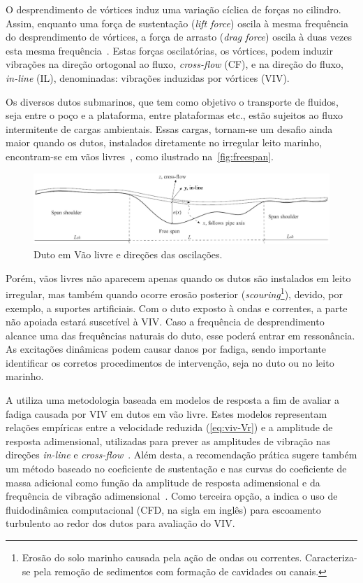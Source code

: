 O desprendimento de vórtices induz uma variação cíclica de forças no cilindro.
Assim, enquanto uma força de sustentação (\textit{lift force}) oscila à mesma frequência do desprendimento de vórtices, a força de arrasto (\textit{drag force}) oscila à duas vezes esta mesma frequência~\cite{Sumer1995}.
Estas forças oscilatórias, os vórtices, podem induzir vibrações na direção ortogonal ao fluxo, \textit{cross-flow} (CF), e na direção do fluxo, \textit{in-line} (IL), denominadas: vibrações induzidas por vórtices (VIV).

Os diversos dutos submarinos, que tem como objetivo o transporte de fluidos, seja entre o poço e a plataforma, entre plataformas etc., estão sujeitos ao fluxo intermitente de cargas ambientais.
Essas cargas, tornam-se um desafio ainda maior quando os dutos, instalados diretamente no irregular leito marinho, encontram-se em vãos livres~\cite{Fyrileiv1998}, como ilustrado na~\autoref{fig:freespan}.

\begin{figure}[!ht]
	\centering
    \caption{Duto em Vão livre e direções das oscilações.}\label{fig:freespan}
	\includegraphics[width=1\textwidth]{imagens/freespan}
\end{figure}

Porém, vãos livres não aparecem apenas quando os dutos são instalados em leito irregular, mas também quando ocorre erosão posterior (\textit{scouring}\footnote{Erosão do solo marinho causada pela ação de ondas ou correntes. Caracteriza-se pela remoção de sedimentos com formação de cavidades ou canais.}), devido, por exemplo, a suportes artificiais.
Com o duto exposto à ondas e correntes, a parte não apoiada estará suscetível à VIV.\@
Caso a frequência de desprendimento alcance uma das frequências naturais do duto, esse poderá entrar em ressonância.
As excitações dinâmicas podem causar danos por fadiga, sendo importante identificar os corretos procedimentos de intervenção, seja no duto ou no leito marinho.

A  utiliza uma metodologia baseada em modelos de resposta a fim de avaliar a fadiga causada por VIV em dutos em vão livre.
Estes modelos representam relações empíricas entre a velocidade reduzida (\autoref{eq:viv-Vr}) e a amplitude de resposta adimensional, utilizadas para prever as amplitudes de vibração nas direções \textit{in-line} e \textit{cross-flow}~\cite{Mork2003,DNV2017}.
Além desta, a recomendação prática sugere também um método baseado no coeficiente de sustentação e nas curvas do coeficiente de massa adicional como função da amplitude de resposta adimensional e da frequência de vibração adimensional~\cite{DNV2017}.
Como terceira opção, a  indica o uso de fluidodinâmica computacional (CFD, na sigla em inglês) para escoamento turbulento ao redor dos dutos para avaliação do VIV.

